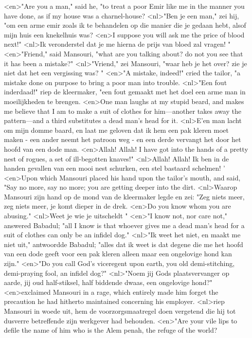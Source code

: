 <en>"Are you a man," said he, "to treat a poor Emir like me in the manner you have done, as if my house was a charnel-house?
<nl>"Ben je een man," zei hij, "om een arme emir zoals ik te behandelen op die manier die je gedaan hebt, alsof mijn huis een knekelhuis was?
<en>I suppose you will ask me the price of blood next!"
<nl>Ik veronderstel dat je me hierna de prijs van bloed zal vragen! "
<en>"Friend," said Mansouri, "what are you talking about? do not you see that it has been a mistake?"
<nl>"Vriend," zei Mansouri, "waar heb je het over? zie je niet dat het een vergissing was? "
<en>"A mistake, indeed!" cried the tailor, "a mistake done on purpose to bring a poor man into trouble.
<nl>"Een fout inderdaad!" riep de kleermaker, "een fout gemaakt met het doel  een arme man in moeilijkheden te brengen.
<en>One man laughs at my stupid beard, and makes me believe that I am to make a suit of clothes for him—another takes away the pattern—and a third substitutes a dead man's head for it.
<nl>E'en man lacht om mijn domme baard, en laat me geloven dat ik hem een pak kleren moet maken - een ander neemt het patroon weg - en een derde vervangt het door  het hoofd van een dode man.
<en>Allah! Allah! I have got into the hands of a pretty nest of rogues, a set of ill-begotten knaves!"
<nl>Allah! Allah! Ik ben in de handen gevallen van een mooi nest schurken, een stel bastaard schelmen! '
<en>Upon which Mansouri placed his hand upon the tailor's mouth, and said, "Say no more, say no more; you are getting deeper into the dirt.
<nl>Waarop Mansouri zijn hand op de mond van de kleermaker legde en zei: "Zeg niets meer, zeg niets meer, je komt dieper in de drek.
<en>Do you know whom you are abusing."
<nl>Weet je wie je uitscheldt "
<en>"I know not, nor care not," answered Babadul; "all I know is that whoever gives me a dead man's head for a suit of clothes can only be an infidel dog."
<nl>"Ik weet het niet, en maakt me niet uit," antwoordde Babadul; "alles dat ik weet is dat degene die me het hoofd van een dode geeft voor een pak kleren alleen maar een ongelovige hond kan zijn."
<en>"Do you call God's viceregent upon earth, you old demi-stitching, demi-praying fool, an infidel dog?"
<nl>"Noem jij Gods plaatsvervanger op aarde, jij oud half-stiksel, half biddende dwaas, een ongelovige hond?"
<en>exclaimed Mansouri in a rage, which entirely made him forget the precaution he had hitherto maintained concerning his employer.
<nl>riep Mansouri in woede uit,  hem de voorzorgsmaatregel doen vergetend die hij tot dusverre betreffende zijn werkgever had behouden.
<en>"Are your vile lips to defile the name of him who is the Alem penah, the refuge of the world?
